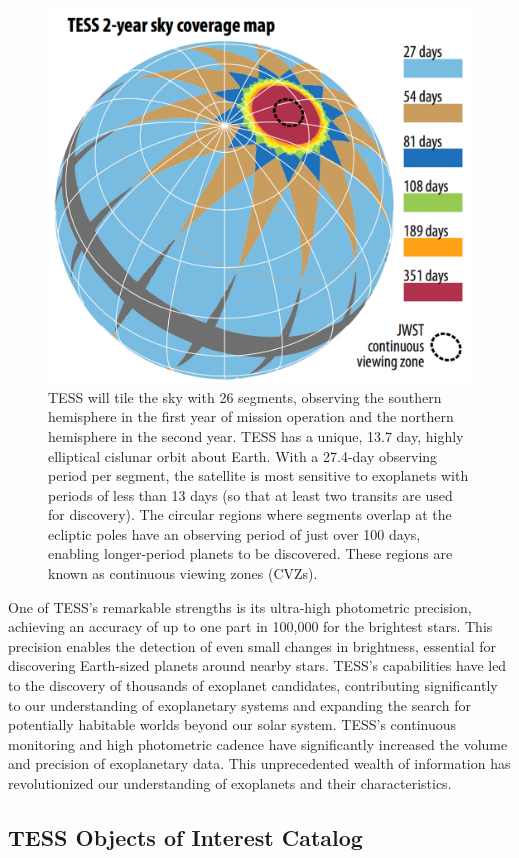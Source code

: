 \documentclass{article}
\begin{document}
\begin{figure}[H]
    \centering
    \includegraphics[width=0.6\linewidth]{image/sky_coverage.png}
    \captionsetup{font=small} 
    \caption{TESS will tile the sky with 26 segments, observing the southern hemisphere in the first year of mission operation and the northern hemisphere in the second year. TESS has a unique, 13.7 day,  highly elliptical cislunar orbit about Earth. With a 27.4-day observing period per segment, the satellite is most sensitive to exoplanets with periods of less than 13 days (so that at least two transits are used for discovery). The circular regions where segments overlap at the ecliptic poles have an observing period of just over 100 days, enabling longer-period planets to be discovered. These regions are known as continuous viewing zones (CVZs).}
    \label{fig:sky_cov}
\end{figure}

One of TESS's remarkable strengths is its ultra-high photometric precision, achieving an accuracy of up to one part in 100,000 for the brightest stars. This precision enables the detection of even small changes in brightness, essential for discovering Earth-sized planets around nearby stars. TESS's capabilities have led to the discovery of thousands of exoplanet candidates, contributing significantly to our understanding of exoplanetary systems and expanding the search for potentially habitable worlds beyond our solar system. TESS's continuous monitoring and high photometric cadence have significantly increased the volume and precision of exoplanetary data. This unprecedented wealth of information has revolutionized our understanding of exoplanets and their characteristics.

\subsection{TESS Objects of Interest Catalog}
\end{document}
